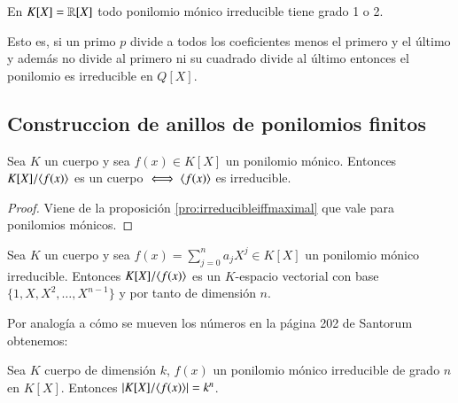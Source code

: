 \begin{obs}
	En $K[X] = \mathbb{R}[X]$ todo ponilomio mónico irreducible tiene grado 1 o 2.
\end{obs}

Esto es, si un primo $p$ divide a todos los coeficientes menos el primero y el último y además no divide al primero ni su cuadrado divide al último entonces el ponilomio es irreducible en $Q[X]$.


\subsection{Construccion de anillos de ponilomios finitos}

\begin{pro}
	Sea $K$ un cuerpo y sea $f(x) \in K[X]$ un ponilomio mónico. Entonces $K[X]/\langle f(x)\rangle$ es un cuerpo $\iff \langle f(x)\rangle$ es irreducible.
\end{pro}

\begin{proof}
	Viene de la proposición \autoref{pro:irreducibleiffmaximal} que vale para ponilomios mónicos.
\end{proof}

\begin{thm}
	Sea $K$ un cuerpo y sea $f(x) = \sum_{j=0}^n a_j X^j \in K[X]$ un ponilomio mónico irreducible. Entonces $K[X] / \langle f(x)\rangle$ es un $K$-espacio vectorial con base $\{1, X, X^2, \dots, X^{n-1}\}$ y por tanto de dimensión $n$.
\end{thm}

Por analogía a cómo se mueven los números en la página 202 de Santorum obtenemos:

\begin{pro}
	Sea $K$ cuerpo de dimensión $k$, $f(x)$ un ponilomio mónico irreducible de grado $n$ en $K[X]$. Entonces $|K[X]/\langle f(x)\rangle| = k^n$.
\end{pro}

